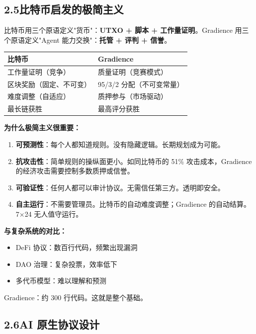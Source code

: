 \documentclass[11pt,a4paper]{article}
\begin{document}
\subsection{2.5\quad 比特币启发的极简主义}

比特币用三个原语定义"货币"：\textbf{UTXO + 脚本 + 工作量证明}。Gradience 用三个原语定义"Agent 能力交换"：\textbf{托管 + 评判 + 信誉}。

\begin{table}[H]\centering
\begin{tabular}{@{}ll@{}}
\toprule
\textbf{比特币} & \textbf{Gradience} \\
\midrule
工作量证明（竞争） & 质量证明（竞赛模式） \\
区块奖励（固定、不可变） & 95/3/2 分配（不可变常量） \\
难度调整（自适应） & 质押参与（市场驱动） \\
最长链获胜 & 最高评分获胜 \\
\bottomrule
\end{tabular}
\end{table}

\textbf{为什么极简主义很重要：}

\begin{enumerate}[leftmargin=2em]
\item \textbf{可预测性}：每个人都知道规则。没有隐藏逻辑。长期规划成为可能。
\item \textbf{抗攻击性}：简单规则的操纵面更小。如同比特币的 51\% 攻击成本，Gradience 的经济攻击需要控制多数质押或信誉。
\item \textbf{可验证性}：任何人都可以审计协议。无需信任第三方。透明即安全。
\item \textbf{自主运行}：不需要管理员。比特币的自动难度调整；Gradience 的自动结算。7×24 无人值守运行。
\end{enumerate}

\textbf{与复杂系统的对比：}
\begin{itemize}[leftmargin=2em]
\item DeFi 协议：数百行代码，频繁出现漏洞
\item DAO 治理：复杂投票，效率低下
\item 多代币模型：难以理解和预测
\end{itemize}

Gradience：约 300 行代码。这就是整个基础。

\subsection{2.6\quad AI 原生协议设计}
\end{document}

